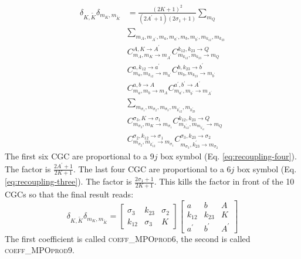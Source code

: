 \documentclass[a4paper,10pt,parskip=full]{scrartcl}
\begin{document}
\begin{equation}
  \begin{split}
  \delta_{K,\tilde{K}}\delta_{m_K,m_{\tilde{K}}}&=
  \frac{(2K+1)^2}{(2A^\prime+1)(2\sigma_1+1)}\sum_{m_Q}\\
  &\sum_{m_{A},m_{A^\prime},m_{a},m_{a^\prime},m_{b},m_{b^\prime},m_{k_{12}},m_{k_{23}}}\\
  &C^{A,K\rightarrow
    A^\prime}_{m_A,m_{K}\rightarrow
    m_{A^\prime}}C^{k_{12},k_{23}\rightarrow
    Q}_{m_{k_{12}},m_{k_{23}}\rightarrow m_{Q}}\\
  &C^{a,k_{12}\rightarrow
    a^\prime}_{m_a,m_{k_{12}}\rightarrow m_{a^\prime}}C^{b,k_{23}\rightarrow b^\prime}_{m_b,m_{k_{23}}\rightarrow m_{b^\prime}}\\
  & C^{a,b\rightarrow
    A}_{{m_a,m_{b}}\rightarrow m_{A}}C^{a^\prime,b^\prime\rightarrow
    A^\prime}_{m_{a^\prime},m_{b^\prime}\rightarrow
    m_{A^\prime}}\\
   &\sum_{m_{\sigma_1},m_{\sigma_2},m_{\sigma_3},m_{k_{12}^\prime},m_{k_{23}^\prime}}\\
   &C^{\sigma_3,K\rightarrow\sigma_1}_{m_{\sigma_3},m_{K}\rightarrow
    m_{\sigma_1}}C^{k_{12},k_{23}\rightarrow Q}_{m_{k_{12}^\prime},m_{m_{k_{12}^\prime}}\rightarrow m_{Q}}\\
  &C^{\sigma_2,k_{12}\rightarrow
    \sigma_1}_{m_{\sigma_2},m_{k_{12}^\prime}\rightarrow m_{\sigma_1}}C^{\sigma_3,k_{23}\rightarrow \sigma_2}_{m_{\sigma_3},k_{23}^\prime\rightarrow m_{\sigma_2}}
  \end{split}
\end{equation}
The first six CGC are proportional to a $9j$ box symbol (Eq. \ref{eq:recoupling-four}). The factor is
$\frac{2A^\prime+1}{2K+1}$.
The last four CGC are proportional to a $6j$ box symbol
(Eq. \ref{eq:recoupling-three}). The factor is
$\frac{2\sigma_1+1}{2K+1}$. This kills the factor in front of the 10
CGCs so that the final result reads:
\begin{equation}
    \delta_{K,\tilde{K}}\delta_{m_K,m_{\tilde{K}}}=
    \begin{bmatrix}
    \sigma_3 & k_{23} & \sigma_2 \\
    k_{12} & \sigma_3 & K
  \end{bmatrix}
  \begin{bmatrix}
    a & b & A \\
    k_{12} & k_{23} & K \\
    a^\prime & b^\prime &A^\prime
  \end{bmatrix}
\end{equation}
The first coefficient is called \textsc{coeff\_MPOprod6}, the second
is called \textsc{coeff\_MPOprod9}.
\end{document}
